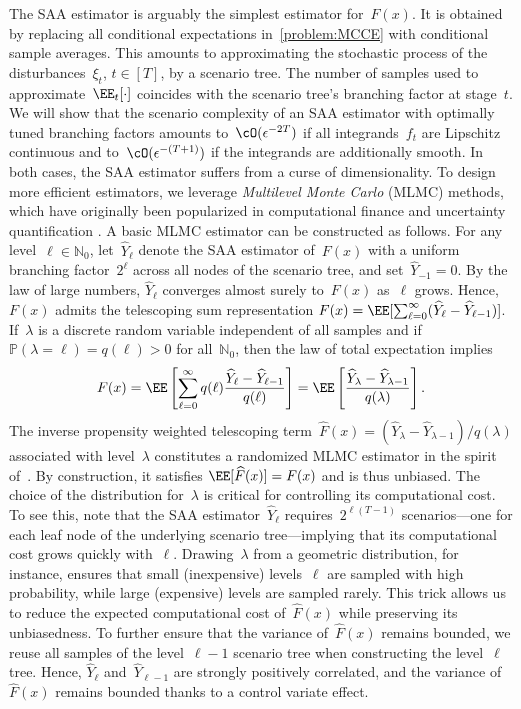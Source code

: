 \documentclass[11pt]{article}
\let\hat\widehat
\begin{document}
The SAA estimator is arguably the simplest estimator for~$F(x)$. It is obtained by replacing all conditional expectations in~\eqref{problem:MCCE} with conditional sample averages. This amounts to approximating the stochastic process of the disturbances~$\xi_t$, $t\in[T]$, by a scenario tree. The number of samples used to approximate~$\EE_t[\cdot]$ coincides with the scenario tree's branching factor at stage~$t$. We will show that the scenario complexity of an SAA estimator with optimally tuned branching factors amounts to~$\cO(\epsilon^{-2T})$ if all integrands~$f_t$ are Lipschitz continuous and to~$\cO(\epsilon^{-(T+1)})$ if the integrands are additionally smooth. In both cases, the SAA estimator suffers from a curse of dimensionality. To design more efficient estimators, we leverage \emph{Multilevel Monte Carlo} (MLMC) methods, which have originally been popularized in computational finance and uncertainty quantification \cite{giles2008multilevel, giles2015multilevel}. A basic MLMC estimator can be constructed as follows. For any level~$\ell\in\mathbb N_0$, let~$\hat Y_\ell$ denote the SAA estimator of~$F(x)$ with a uniform branching factor~$2^\ell$ across all nodes of the scenario tree, and set~$\hat Y_{-1}=0$. By the law of large numbers, $\hat Y_\ell$ converges almost surely to~$F(x)$ as~$\ell$ grows. Hence, $F(x)$ admits the telescoping sum representation $F(x) = \EE [\sum_{\ell=0}^\infty (\hat Y_\ell -\hat Y_{\ell -1}) ]$. If~$\lambda$ is a discrete random variable independent of all samples and if~$\mathbb P(\lambda=\ell)=q(\ell)>0$ for all~$\mathbb N_0$, then the law of total expectation implies
\begin{equation}
	\label{eq:MLMC-basic}
    	F(x) = \EE \left[\sum_{\ell=0}^\infty q(\ell) \frac{\hat Y_\ell -\hat Y_{\ell -1}}{q(\ell)} \right] = \EE \left[\frac{\hat Y_\lambda -\hat Y_{\lambda -1}}{q(\lambda)} \right].
\end{equation}
The inverse propensity weighted telescoping term~$\hat F(x)=(\hat Y_\lambda -\hat Y_{\lambda -1})/q(\lambda)$ associated with level~$\lambda$ constitutes a randomized MLMC estimator in the spirit of~\cite{rhee2015unbiased, blanchet2015unbiased}. By construction, it satisfies $\EE[\hat F(x)]=F(x)$ and is thus unbiased. The choice of the distribution for~$\lambda$ is critical for controlling its computational cost. To see this, note that the SAA estimator~$\hat Y_\ell$ requires~$2^{\ell(T-1)}$ scenarios---one for each leaf node of the underlying scenario tree---implying that its computational cost grows quickly with~$\ell$. Drawing~$\lambda$ from a geometric distribution, for instance, ensures that small (inexpensive) levels~$\ell$ are sampled with high probability, while large (expensive) levels are sampled rarely. This trick allows us to reduce the expected computational cost of~$\hat F(x)$ while preserving its unbiasedness. To further ensure that the variance of~$\hat F(x)$ remains bounded, we reuse all samples of the level~$\ell -1$ scenario tree when constructing the level~$\ell$ tree. Hence, $\hat Y_\ell$ and~$\hat Y_{\ell-1}$ are strongly positively correlated, and the variance of~$\hat F(x)$ remains bounded thanks to a control variate effect.
\end{document}
